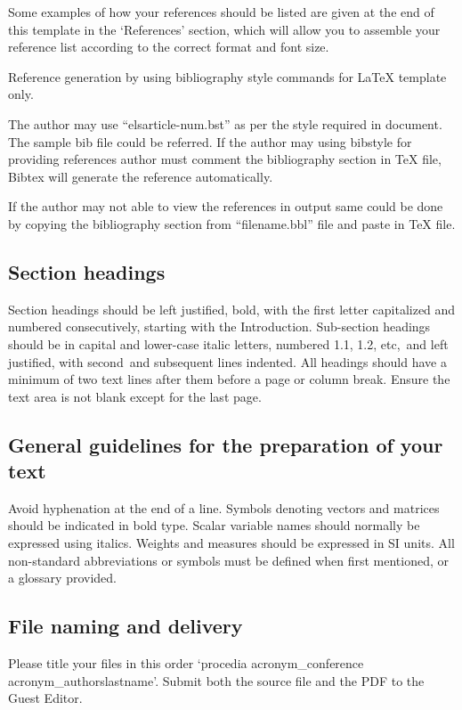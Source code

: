 \documentclass[5p,times,procedia]{Definitions/elsarticle}
\begin{document}
Some examples of how your references should be listed are given at the end of this template in the `References' section, which will allow you to assemble your reference list according to the correct format and font size.

Reference generation by using bibliography style commands for LaTeX template only.

The author may use ``elsarticle-num.bst'' as per the style required in document. The sample bib file could be referred. 
If the author may using bibstyle for providing references author must comment the bibliography section in TeX file, Bibtex will generate the reference automatically.

If the author may not able to view the references in output same could be done by copying the bibliography section from ``filename.bbl'' file and paste in TeX file.



\subsection{Section headings}
Section headings should be left justified, bold, with the first letter capitalized and numbered consecutively, starting with the Introduction. Sub-section headings should be in capital and lower-case italic letters, numbered 1.1, 1.2, etc,~and left justified, with second~and subsequent lines indented. All headings should have a minimum of two text lines after them before a page or column break.
Ensure the text area is not blank except for the last page.

\subsection{General guidelines for the preparation of your text}
Avoid hyphenation at the end of a line. Symbols denoting vectors and matrices should be indicated in bold type. Scalar variable names should normally be expressed using italics. Weights and measures should be expressed in SI units. All non-standard abbreviations or symbols must be defined when first mentioned, or a glossary provided.

\subsection{File naming and delivery}
Please title your files in this order `procedia acronym\_conference acronym\_authorslastname'.  Submit both the source file and the PDF to the Guest Editor.
\end{document}
